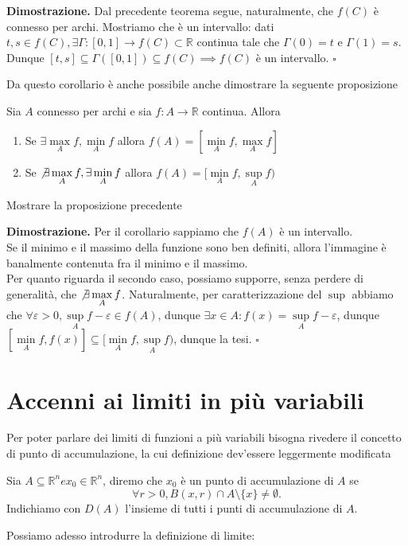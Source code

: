 \noindent \textbf{Dimostrazione. }
Dal precedente teorema segue, naturalmente, che $f(C)$ è connesso per archi. Mostriamo che è un intervallo: dati $t, s \in f(C), \exists \Gamma: [0,1] \to f(C) \subset \mathbb{R}$ continua tale che $\Gamma(0) = t$ e $\Gamma(1) = s$. Dunque $[t,s] \subseteq \Gamma([0, 1]) \subseteq f(C) \implies f(C)$ è un intervallo.
\hfill $\square$

\vspace{0.5cm}
\noindent Da questo corollario è anche possibile anche dimostrare la seguente proposizione
\begin{prop}
Sia $A$ connesso per archi e sia $f: A \to \mathbb{R}$ continua. Allora

\begin{enumerate}[label=\protect\circled{\arabic*}]
	\item Se $\exists \max\limits_{A} f, \min\limits_{A} f$ allora $f(A) = [\min\limits_{A} f, \max\limits_{A} f]$
	\item Se $\not\exists \max\limits_{A} f, \exists \min\limits_{A} f$ allora $f(A)=[\min\limits_{A} f, \sup\limits_{A} f)$
\end{enumerate}
\end{prop}

\vspace{0.5cm}
\begin{exercise}
Mostrare la proposizione precedente
\end{exercise}

\noindent \textbf{Dimostrazione. }
Per il corollario sappiamo che $f(A)$ è un intervallo. \\
Se il minimo e il massimo della funzione sono ben definiti, allora l'immagine è banalmente contenuta fra il minimo e il massimo. \\
Per quanto riguarda il secondo caso, possiamo supporre, senza perdere di generalità, che $\not\exists \max\limits_{A} f$. Naturalmente, per caratterizzazione del $\sup$ abbiamo che $\forall \varepsilon > 0, \sup\limits_{A}{f} - \varepsilon \in f(A)$, dunque $\exists x \in A: f(x) = \sup\limits_{A}{f} - \varepsilon$, dunque $[\min\limits_{A} f, f(x)] \subseteq [\min\limits_A{f}, \sup\limits_{A}{f})$, dunque la tesi.
\hfill $\square$

\vspace{0.5cm}
\section{Accenni ai limiti in più variabili}
Per poter parlare dei limiti di funzioni a più variabili bisogna rivedere il concetto di punto di accumulazione, la cui definizione dev'essere leggermente modificata
\vspace{0.5cm}
\begin{definition}[\textcolor{blue}{punto di accumulazione}]
	Sia $A \subseteq \mathbb{R}^n e x_0 \in \mathbb{R}^n$, diremo che $x_0$ è un punto di accumulazione di $A$ se
	$$
		\forall r > 0, B(x, r) \cap A \setminus \{ x \} \neq \emptyset.
	$$
	Indichiamo con $D(A)$ l'insieme di tutti i punti di accumulazione di $A$.
\end{definition}
\vspace{0.5cm}
Possiamo adesso introdurre la definizione di limite:

